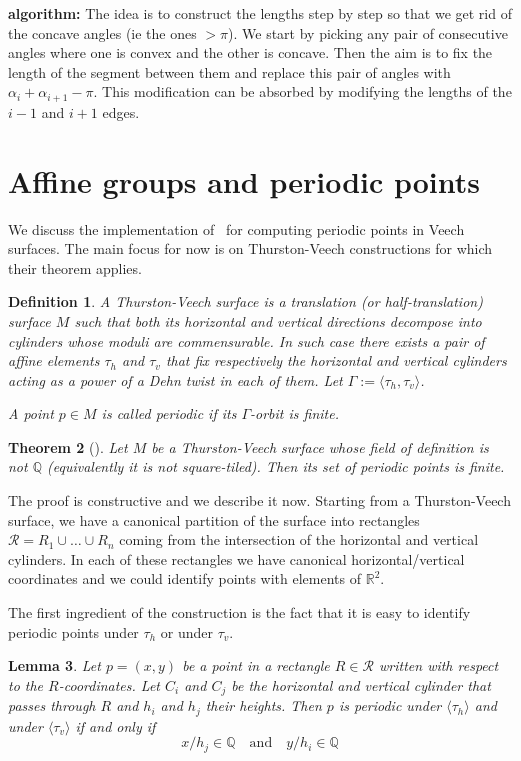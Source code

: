 \documentclass[a4paper,12pt]{article}
\def\bR{\mathbb{R}}
\def\bQ{\mathbb{Q}}
\newtheorem{definition}{Definition}
\newtheorem{lemma}[definition]{Lemma}
\newtheorem{theorem}[definition]{Theorem}
\begin{document}
\textbf{algorithm:}
The idea is to construct the lengths step by step so that we get rid of the concave angles
(ie the ones $> \pi$). We start by picking any pair of consecutive angles where one is
convex and the other is concave. Then the aim is to fix the length of the segment between
them and replace this pair of angles with $\alpha_i + \alpha_{i+1} - \pi$. This modification can be absorbed by modifying the lengths of the $i-1$ and $i+1$ edges.


\section{Affine groups and periodic points}
We discuss the implementation of~\cite{ChowdhuryEverettFreedmanLee} for computing
periodic points in Veech surfaces. The main focus for now is on Thurston-Veech
constructions for which their theorem applies.

\begin{definition}
A \emph{Thurston-Veech surface} is a translation (or half-translation) surface $M$ such
that both its horizontal and vertical directions decompose into cylinders
whose moduli are commensurable. In such case there exists a pair of affine
elements $\tau_h$ and $\tau_v$ that fix respectively the horizontal and
vertical cylinders acting as a power of a Dehn twist in each of them.
Let $\Gamma := \langle \tau_h, \tau_v \rangle$.

A point $p \in M$ is called \emph{periodic} if its $\Gamma$-orbit is finite.
\end{definition}

\begin{theorem}[\cite{ChowdhuryEverettFreedmanLee}]
Let $M$ be a Thurston-Veech surface whose field of definition is not $\bQ$
(equivalently it is not square-tiled). Then its set of periodic points
is finite.
\end{theorem}

The proof is constructive and we describe it now.
Starting from a Thurston-Veech surface, we have a canonical partition of the
surface into rectangles $\mathcal{R} = R_1 \cup \ldots \cup R_n$ coming
from the intersection of the horizontal and vertical cylinders. In each
of these rectangles we have canonical horizontal/vertical coordinates and we could
identify points with elements of $\bR^2$. 

The first ingredient of the construction is the fact that it is easy to identify
periodic points under $\tau_h$ or under $\tau_v$.
\begin{lemma}
Let $p=(x,y)$ be a point in a rectangle $R \in \mathcal{R}$ written with
respect to the $R$-coordinates. Let $C_i$ and $C_j$ be the horizontal
and vertical cylinder that passes through $R$ and $h_i$ and $h_j$
their heights. Then $p$ is periodic under $\langle \tau_h \rangle$ and
under $\langle \tau_v \rangle$ if and only if 
\begin{equation}
\label{eq:tauh:tauv:periodicity}
x / h_j \in \bQ
\quad \text{and} \quad
y / h_i \in \bQ
\end{equation}
\end{lemma}
\end{document}
